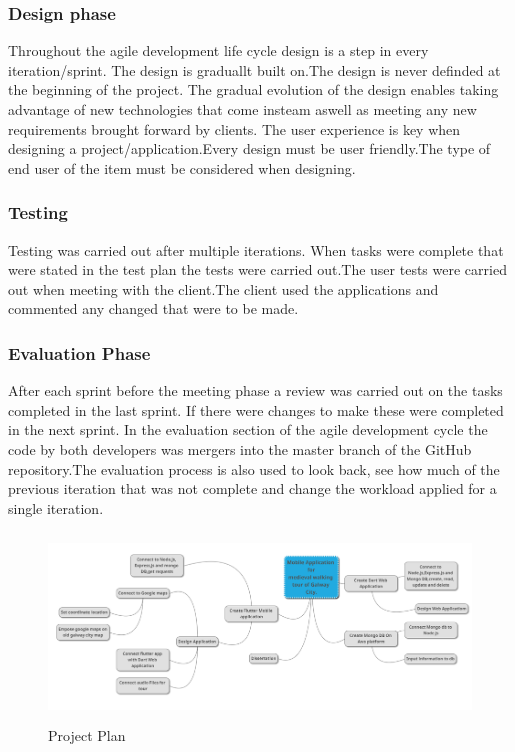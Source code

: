 \subsubsection{Design phase}
Throughout the agile development life cycle design is a step in every iteration/sprint. The design is graduallt built on.The design is never definded at the beginning of the project. The gradual evolution of the design enables taking advantage of new technologies that come insteam aswell as meeting any new requirements brought forward by clients. The user experience is key when designing a project/application.Every design must be user friendly.The type of end user of the item must be considered when designing.

\subsubsection{Testing}
Testing was carried out after multiple iterations. When tasks were complete that were stated in the test plan the tests were carried out.The user tests were carried out when meeting with the client.The client used the applications and commented any changed that were to be made.


\subsubsection{Evaluation Phase}
After each sprint before the meeting phase a review was carried out on the tasks completed in the last sprint. If there were changes to make these were completed in the next sprint. In the evaluation section of the agile development cycle the code by both developers was mergers into the master branch of the GitHub repository.The evaluation process is also used to look back, see how much of the previous iteration that was not complete and change the workload applied for a single iteration.\cite{agile_process}


\begin{figure}[ht]
    \centering
 \includegraphics[width=135mm, height=50mm,scale=0.5]{img/plan.png}
\caption{Project Plan}
\label{fig:Project Plan}
\end{figure}

